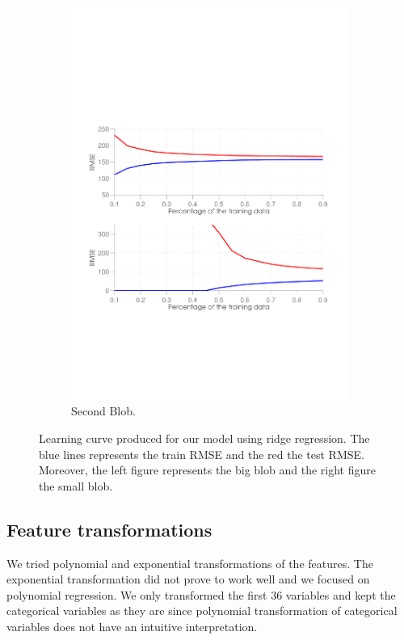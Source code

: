 \begin{figure}[ht]
\begin{subfigure}[b]{0.48\textwidth}
    \includegraphics[clip, trim=0cm 0cm 0cm 8cm, width=\textwidth]{figures/learning_curve.pdf}
    \caption{Second Blob.}
    \label{fig:learning_curve_degre_blob2}
  \end{subfigure}
  \caption{Learning curve produced for our model using ridge regression. The blue lines represents the train RMSE and the red the test RMSE. Moreover, the left figure represents the big blob and the right figure the small blob.}
\end{figure}

\subsection{Feature transformations}
We tried polynomial and exponential transformations of the features.
The exponential transformation did not prove to work well and we focused on polynomial regression.
We only transformed the first 36 variables and kept the categorical variables as they are since polynomial transformation of categorical variables does not have an intuitive interpretation. 

